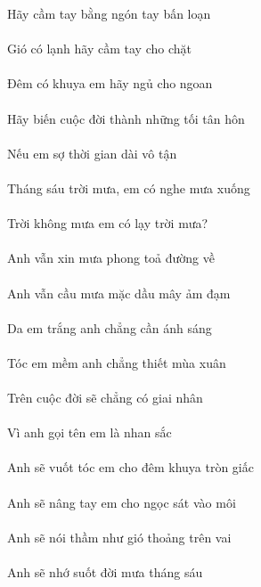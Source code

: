 \documentclass[14pt,a4paper]{extarticle}
\begin{document}
Hãy cầm tay bằng ngón tay bấn loạn\\[1ex]
{\Huge{}\tay{}\tay{}}\\[1ex]
Gió có lạnh hãy cầm tay cho chặt\\[1ex]
{\Huge{}\tay\cho{}}\\[1ex]
Đêm có khuya em hãy ngủ cho ngoan\\[1ex]
{\Huge{}\khuya\em{}\cho\ngoan}\\[1ex]
Hãy biến cuộc đời thành những tối tân hôn\\[1ex]
{\Huge{} }\\[1ex]
Nếu em sợ thời gian dài vô tận\\[1ex]
{\Huge{}\em{}\gian{}}\\[1ex]
Tháng sáu trời mưa, em có nghe mưa xuống\\[1ex]
{\Huge{}\em{}\nghe{} }\\[1ex]
Trời không mưa em có lạy trời mưa?\\[1ex]
{\Huge{}\em{}}\\[1ex]
Anh vẫn xin mưa phong toả đường về\\[1ex]
{\Huge\ANH{}\xin{}\Phong{}}\\[1ex]
Anh vẫn cầu mưa mặc dầu mây ảm đạm\\[1ex]
{\Huge\ANH{} }\\[1ex]
Da em trắng anh chẳng cần ánh sáng\\[1ex]
{\Huge\da\em{}\ANH{}}\\[1ex]
Tóc em mềm anh chẳng thiết mùa xuân\\[1ex]
{\Huge{}\em{}\ANH{}}\\[1ex]
Trên cuộc đời sẽ chẳng có giai nhân\\[1ex]
{\Huge{}\giai{}}\\[1ex]
Vì anh gọi tên em là nhan sắc\\[1ex]
{\Huge{}\ANH{}\em{}\nhan{}}\\[1ex]
Anh sẽ vuốt tóc em cho đêm khuya tròn giấc\\[1ex]
{\Huge\ANH{}\em\cho{}\khuya {} }\\[1ex]
Anh sẽ nâng tay em cho ngọc sát vào môi\\[1ex]
{\Huge\ANH{}\tay\em\cho{}  }\\[1ex]
Anh sẽ nói thầm như gió thoảng trên vai\\[1ex]
{\Huge\ANH{} \vai}\\[1ex]
Anh sẽ nhớ suốt đời mưa tháng sáu\\[1ex]
{\Huge\ANH{}}
\end{document}
